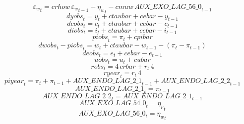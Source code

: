 \begin{dmath}
{{\varepsilon_w}}_{t}={crhow}\, {{\varepsilon_w}}_{t-1}+{{\eta_w}}_{t}-{cmuw}\, {AUX\_EXO\_LAG\_56\_0}_{t-1}
\end{dmath}
\begin{dmath}
{dyobs}_{t}={{y}}_{t}+{ctaubar}+{cebar}-{{y}}_{t-1}
\end{dmath}
\begin{dmath}
{dcobs}_{t}={{c}}_{t}+{ctaubar}+{cebar}-{{c}}_{t-1}
\end{dmath}
\begin{dmath}
{diobs}_{t}={{i}}_{t}+{ctaubar}+{cebar}-{{i}}_{t-1}
\end{dmath}
\begin{dmath}
{piobs}_{t}={{\pi}}_{t}+{cpibar}
\end{dmath}
\begin{dmath}
{dwobs}_{t}-{piobs}_{t}={{w}}_{t}+{ctaubar}-{{w}}_{t-1}-\left({{\pi}}_{t}-{{\pi}}_{t-1}\right)
\end{dmath}
\begin{dmath}
{deobs}_{t}={{e}}_{t}+{cebar}-{{e}}_{t-1}
\end{dmath}
\begin{dmath}
{uobs}_{t}={{u}}_{t}+{cubar}
\end{dmath}
\begin{dmath}
{robs}_{t}=4\, {crbar}+{{r}}_{t}\, 4
\end{dmath}
\begin{dmath}
{ryear}_{t}={{r}}_{t}\, 4
\end{dmath}
\begin{dmath}
{piyear}_{t}={{\pi}}_{t}+{{\pi}}_{t-1}+{AUX\_ENDO\_LAG\_2\_1}_{t-1}+{AUX\_ENDO\_LAG\_2\_2}_{t-1}
\end{dmath}
\begin{dmath}
{AUX\_ENDO\_LAG\_2\_1}_{t}={{\pi}}_{t-1}
\end{dmath}
\begin{dmath}
{AUX\_ENDO\_LAG\_2\_2}_{t}={AUX\_ENDO\_LAG\_2\_1}_{t-1}
\end{dmath}
\begin{dmath}
{AUX\_EXO\_LAG\_54\_0}_{t}={{\eta_p}}_{t}
\end{dmath}
\begin{dmath}
{AUX\_EXO\_LAG\_56\_0}_{t}={{\eta_w}}_{t}
\end{dmath}
